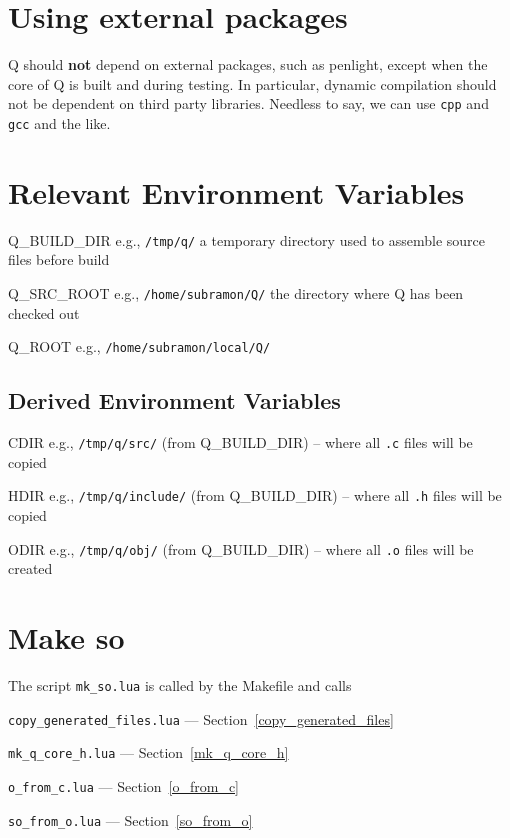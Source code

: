 
\section{Using external packages}
Q should {\bf not} depend on external packages, such as penlight, except when
the core of Q is built and during testing. In particular, dynamic compilation
should not be dependent on third party libraries. Needless to say, we can use
{\tt cpp} and {\tt gcc} and the like.

\section{Relevant Environment Variables}
\be
\item Q\_BUILD\_DIR e.g., \verb+/tmp/q/+ a temporary directory used 
to assemble source files before build 
\item Q\_SRC\_ROOT e.g., \verb+/home/subramon/Q/+ the directory where Q has been
checked out 
\item Q\_ROOT e.g., \verb+/home/subramon/local/Q/+
\ee

\subsection{Derived Environment Variables}
\be
\item CDIR e.g., \verb+/tmp/q/src/+ (from Q\_BUILD\_DIR) 
-- where all {\tt .c} files will be copied
\item HDIR e.g., \verb+/tmp/q/include/+ (from Q\_BUILD\_DIR)
-- where all {\tt .h} files will be copied
\item ODIR e.g., \verb+/tmp/q/obj/+ (from Q\_BUILD\_DIR)
-- where all {\tt .o} files will be created
\ee

\section{Make so}

The script {\tt mk\_so.lua} is called by the Makefile and calls
\be 
\item {\tt copy\_generated\_files.lua} --- 
Section~\ref{copy_generated_files}
\item {\tt mk\_q\_core\_h.lua} --- Section~\ref{mk_q_core_h}
\item {\tt o\_from\_c.lua} --- Section~\ref{o_from_c}
\item {\tt so\_from\_o.lua} --- Section~\ref{so_from_o}
\ee

